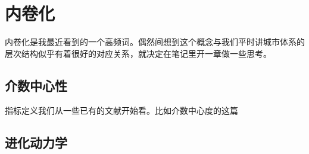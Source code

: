 \chapter{内卷化}

内卷化是我最近看到的一个高频词。偶然间想到这个概念与我们平时讲城市体系的层次结构似乎有着很好的对应关系，就决定在笔记里开一章做一些思考。

\section{介数中心性}

指标定义我们从一些已有的文献开始看。比如介数中心度的这篇~\cite{Barthelemy2018BC}

\section{进化动力学}